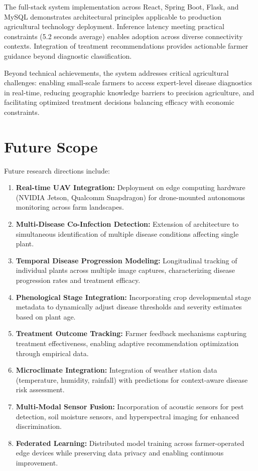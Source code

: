 \documentclass[conference]{IEEEtran}
\begin{document}
The full-stack system implementation across React, Spring Boot, Flask, and MySQL demonstrates architectural principles applicable to production agricultural technology deployment. Inference latency meeting practical constraints (5.2 seconds average) enables adoption across diverse connectivity contexts. Integration of treatment recommendations provides actionable farmer guidance beyond diagnostic classification.

Beyond technical achievements, the system addresses critical agricultural challenges: enabling small-scale farmers to access expert-level disease diagnostics in real-time, reducing geographic knowledge barriers to precision agriculture, and facilitating optimized treatment decisions balancing efficacy with economic constraints.

\section{Future Scope}

Future research directions include:

\begin{enumerate}
\item \textbf{Real-time UAV Integration:} Deployment on edge computing hardware (NVIDIA Jetson, Qualcomm Snapdragon) for drone-mounted autonomous monitoring across farm landscapes.

\item \textbf{Multi-Disease Co-Infection Detection:} Extension of architecture to simultaneous identification of multiple disease conditions affecting single plant.

\item \textbf{Temporal Disease Progression Modeling:} Longitudinal tracking of individual plants across multiple image captures, characterizing disease progression rates and treatment efficacy.

\item \textbf{Phenological Stage Integration:} Incorporating crop developmental stage metadata to dynamically adjust disease thresholds and severity estimates based on plant age.

\item \textbf{Treatment Outcome Tracking:} Farmer feedback mechanisms capturing treatment effectiveness, enabling adaptive recommendation optimization through empirical data.

\item \textbf{Microclimate Integration:} Integration of weather station data (temperature, humidity, rainfall) with predictions for context-aware disease risk assessment.

\item \textbf{Multi-Modal Sensor Fusion:} Incorporation of acoustic sensors for pest detection, soil moisture sensors, and hyperspectral imaging for enhanced discrimination.

\item \textbf{Federated Learning:} Distributed model training across farmer-operated edge devices while preserving data privacy and enabling continuous improvement.
\end{enumerate}
\end{document}
